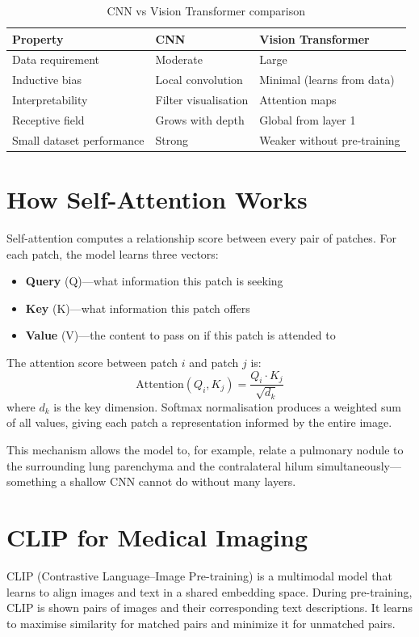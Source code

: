 \begin{table}[h]
\centering
\caption{CNN vs Vision Transformer comparison}
\begin{tabular}{|l|l|l|}
\hline
\textbf{Property} & \textbf{CNN} & \textbf{Vision Transformer} \\
\hline
Data requirement & Moderate & Large \\
\hline
Inductive bias & Local convolution & Minimal (learns from data) \\
\hline
Interpretability & Filter visualisation & Attention maps \\
\hline
Receptive field & Grows with depth & Global from layer 1 \\
\hline
Small dataset performance & Strong & Weaker without pre-training \\
\hline
\end{tabular}
\end{table}

\section{How Self-Attention Works}
Self-attention computes a relationship score between every pair of patches. For each patch, the model learns three vectors:
\begin{itemize}
    \item \textbf{Query} (Q)---what information this patch is seeking
    \item \textbf{Key} (K)---what information this patch offers
    \item \textbf{Value} (V)---the content to pass on if this patch is attended to
\end{itemize}

The attention score between patch $i$ and patch $j$ is:
\[
\text{Attention}(Q_i, K_j) = \frac{Q_i \cdot K_j}{\sqrt{d_k}}
\]
where $d_k$ is the key dimension. Softmax normalisation produces a weighted sum of all values, giving each patch a representation informed by the entire image.

This mechanism allows the model to, for example, relate a pulmonary nodule to the surrounding lung parenchyma and the contralateral hilum simultaneously---something a shallow CNN cannot do without many layers.

\section{CLIP for Medical Imaging}
CLIP (Contrastive Language--Image Pre-training) is a multimodal model that learns to align images and text in a shared embedding space. During pre-training, CLIP is shown pairs of images and their corresponding text descriptions. It learns to maximise similarity for matched pairs and minimize it for unmatched pairs.

